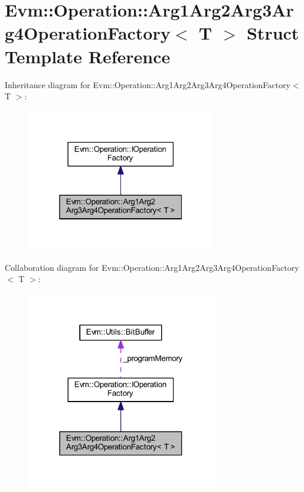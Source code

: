 \hypertarget{struct_evm_1_1_operation_1_1_arg1_arg2_arg3_arg4_operation_factory}{}\section{Evm\+:\+:Operation\+:\+:Arg1\+Arg2\+Arg3\+Arg4\+Operation\+Factory$<$ T $>$ Struct Template Reference}
\label{struct_evm_1_1_operation_1_1_arg1_arg2_arg3_arg4_operation_factory}


Inheritance diagram for Evm\+:\+:Operation\+:\+:Arg1\+Arg2\+Arg3\+Arg4\+Operation\+Factory$<$ T $>$\+:
\nopagebreak
\begin{figure}[H]
\begin{center}
\leavevmode
\includegraphics[width=235pt]{struct_evm_1_1_operation_1_1_arg1_arg2_arg3_arg4_operation_factory__inherit__graph}
\end{center}
\end{figure}


Collaboration diagram for Evm\+:\+:Operation\+:\+:Arg1\+Arg2\+Arg3\+Arg4\+Operation\+Factory$<$ T $>$\+:
\nopagebreak
\begin{figure}[H]
\begin{center}
\leavevmode
\includegraphics[width=237pt]{struct_evm_1_1_operation_1_1_arg1_arg2_arg3_arg4_operation_factory__coll__graph}
\end{center}
\end{figure}
